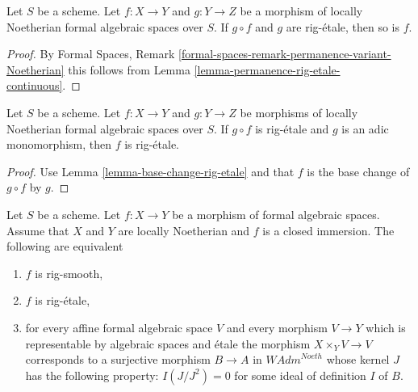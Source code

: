 \begin{lemma}
\label{lemma-rig-etale-permanence}
Let $S$ be a scheme. Let $f : X \to Y$ and $g : Y \to Z$
be a morphism of locally Noetherian formal algebraic spaces over $S$.
If $g \circ f$ and $g$ are rig-\'etale, then so is $f$.
\end{lemma}

\begin{proof}
By Formal Spaces, Remark
\ref{formal-spaces-remark-permanence-variant-Noetherian}
this follows from Lemma \ref{lemma-permanence-rig-etale-continuous}.
\end{proof}

\begin{lemma}
\label{lemma-rig-etale-alternative-permanence}
Let $S$ be a scheme. Let $f : X \to Y$ and $g : Y \to Z$
be morphisms of locally Noetherian formal algebraic spaces over $S$.
If $g \circ f$ is rig-\'etale and $g$ is an adic monomorphism, then
$f$ is rig-\'etale.
\end{lemma}

\begin{proof}
Use Lemma \ref{lemma-base-change-rig-etale} and that
$f$ is the base change of $g \circ f$ by $g$.
\end{proof}

\begin{lemma}
\label{lemma-closed-immersion-rig-smooth}
Let $S$ be a scheme. Let $f : X \to Y$ be a morphism of formal algebraic
spaces. Assume that $X$ and $Y$ are locally Noetherian and $f$ is a
closed immersion. The following are equivalent
\begin{enumerate}
\item $f$ is rig-smooth,
\item $f$ is rig-\'etale,
\item for every affine formal algebraic space $V$ and every morphism
$V \to Y$ which is representable by algebraic spaces and \'etale
the morphism $X \times_Y V \to V$ corresponds to a surjective morphism
$B \to A$ in $\textit{WAdm}^{Noeth}$ whose kernel $J$ has the following
property: $I(J/J^2) = 0$ for some ideal of definition $I$ of $B$.
\end{enumerate}
\end{lemma}

